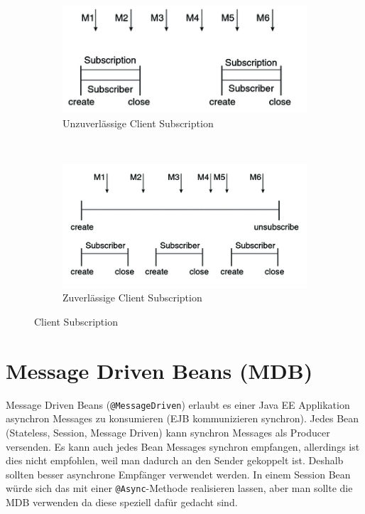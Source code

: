 \begin{figure}
	\centering
	\begin{subfigure}[b]{0.48\textwidth}
		\includegraphics[width=\textwidth]{fig/jms-nondurableSubscriber}
		\caption{Unzuverlässige Client Subscription}
		\label{fig:jms-nondurable-subscriber}
	\end{subfigure}
	~
	\begin{subfigure}[b]{0.48\textwidth}
		\includegraphics[width=\textwidth]{fig/jms-durableSubscriber}
		\caption{Zuverlässige Client Subscription}
		\label{fig:jms-durable-subscriber}
	\end{subfigure}
	\caption{Client Subscription}
\end{figure} 

\section{Message Driven Beans (MDB)}

Message Driven Beans (\verb|@MessageDriven|) erlaubt es einer Java EE Applikation asynchron Messages zu konsumieren (EJB kommunizieren synchron). Jedes Bean (Stateless, Session, Message Driven) kann synchron Messages als Producer versenden. Es kann auch jedes Bean Messages synchron empfangen, allerdings ist dies nicht empfohlen, weil man dadurch an den Sender gekoppelt ist. Deshalb sollten besser asynchrone Empfänger verwendet werden. In einem Session Bean würde sich das mit einer \verb|@Async|-Methode realisieren lassen, aber man sollte die MDB verwenden da diese speziell dafür gedacht sind.

